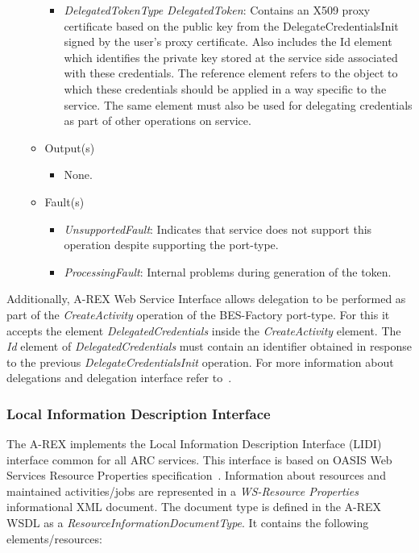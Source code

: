 \documentclass{article}                            %
\begin{document}
\begin{itemize}
\begin{itemize}
\begin{itemize}
\item \emph{DelegatedTokenType DelegatedToken}: Contains an X509 proxy certificate
based on the public key from the DelegateCredentialsInit signed by
the user's proxy certificate. Also includes the Id element which identifies
the private key stored at the service side associated with these credentials.
The reference element refers to the object to which these credentials
should be applied in a way specific to the service. The same element
must also be used for delegating credentials as part of other operations
on service.
\end{itemize}
\item Output(s)
\begin{itemize}
\item None.
\end{itemize}
\item Fault(s)
\begin{itemize}
\item \emph{UnsupportedFault}: Indicates that service does not support this
operation despite supporting the port-type.
\item \emph{ProcessingFault}: Internal problems during generation of the
token.
\end{itemize}
\end{itemize}
\end{itemize}

Additionally, A-REX Web Service Interface allows delegation to be
performed as part of the \emph{CreateActivity} operation of the BES-Factory
port-type. For this it accepts the element \emph{DelegatedCredentials}
inside the \emph{CreateActivity} element. The \emph{Id} element of
\emph{DelegatedCredentials} must contain an identifier obtained in
response to the previous \emph{DelegateCredentialsInit} operation.
For more information about delegations and delegation interface refer
to~\cite{wsrf-rp}.

\subsubsection{Local Information Description Interface}

The A-REX implements the Local Information Description Interface (LIDI)
interface common for all ARC services. This interface is based on
OASIS Web Services Resource Properties specification~\cite{wsrf-rp}.
Information about resources and maintained activities/jobs are represented
in a \emph{WS-Resource Properties} informational XML document. The
document type is defined in the A-REX WSDL as a \emph{ResourceInformationDocumentType}.
It contains the following elements/resources:
\end{document}
